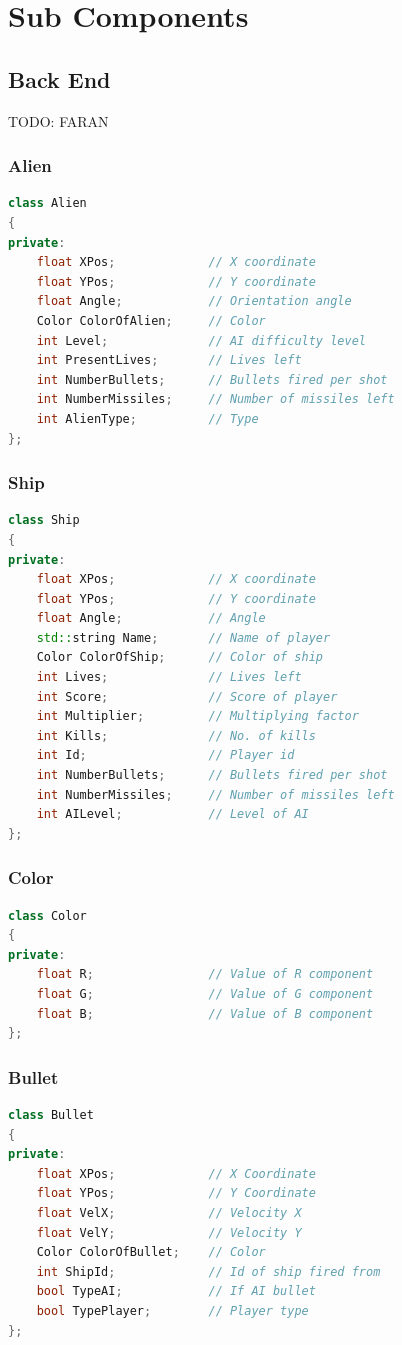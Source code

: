 \documentclass{article}
\begin{document}
	\section{Sub Components}

			\subsection{Back End}
				TODO: FARAN
				\subsubsection{Alien}
					\begin{lstlisting}[language=C++, caption={Class Parameters for Alien}]
class Alien
{
private:
	float XPos;				// X coordinate
	float YPos;				// Y coordinate
	float Angle;			// Orientation angle
	Color ColorOfAlien;		// Color
	int Level;				// AI difficulty level
	int PresentLives;		// Lives left
	int NumberBullets;		// Bullets fired per shot
	int NumberMissiles;		// Number of missiles left
	int AlienType;			// Type
};
					\end{lstlisting}
				\subsubsection{Ship}
					\begin{lstlisting}[language=C++, caption={Class Parameters for Ship}]
class Ship
{
private:
	float XPos;				// X coordinate
	float YPos;				// Y coordinate
	float Angle;			// Angle
	std::string Name;		// Name of player
	Color ColorOfShip;		// Color of ship
	int Lives;				// Lives left
	int Score;				// Score of player
	int Multiplier;			// Multiplying factor
	int Kills;				// No. of kills
	int Id;					// Player id
	int NumberBullets;		// Bullets fired per shot
	int NumberMissiles;		// Number of missiles left
	int AILevel;			// Level of AI
};
					\end{lstlisting}
				\subsubsection{Color}
					\begin{lstlisting}[language=C++, caption={Class Parameters for Color}]
class Color
{
private:
	float R;				// Value of R component
	float G;				// Value of G component
	float B;				// Value of B component
};
					\end{lstlisting}
				\subsubsection{Bullet}
					\begin{lstlisting}[language=C++, caption={Class Parameters for Bullet}]
class Bullet
{
private:
	float XPos;				// X Coordinate
	float YPos;				// Y Coordinate
	float VelX;				// Velocity X
	float VelY;				// Velocity Y
	Color ColorOfBullet;	// Color
	int ShipId;				// Id of ship fired from
	bool TypeAI;			// If AI bullet
	bool TypePlayer;		// Player type
};
					\end{lstlisting}
\end{document}
